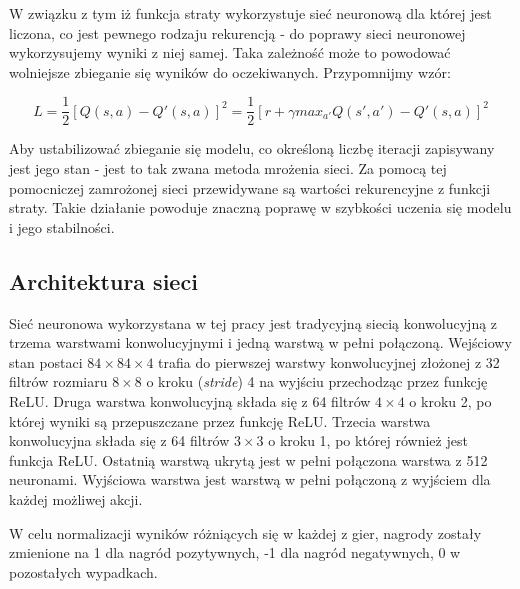 \documentclass[12pt]{article}
\begin{document}
W związku z tym iż funkcja straty wykorzystuje sieć neuronową dla której jest liczona, co jest pewnego rodzaju rekurencją - do poprawy sieci neuronowej wykorzysujemy wyniki z niej samej. Taka zależność może to powodować wolniejsze zbieganie się wyników do oczekiwanych. Przypomnijmy wzór: 

$$L=\frac{1}{2}[Q(s,a)-Q'(s,a)]^2=\frac{1}{2}[r+\gamma max_{a'}Q(s',a')-Q'(s,a)]^2$$

Aby ustabilizować zbieganie się modelu, co określoną liczbę iteracji zapisywany jest jego stan - jest to tak zwana metoda mrożenia sieci. Za pomocą tej pomocniczej zamrożonej sieci przewidywane są wartości rekurencyjne z funkcji straty. Takie działanie powoduje znaczną poprawę w szybkości uczenia się modelu i jego stabilności.

\subsection{Architektura sieci \cite{deepmind_2}}

Sieć neuronowa wykorzystana w tej pracy jest tradycyjną siecią konwolucyjną z trzema warstwami konwolucyjnymi i jedną warstwą w pełni połączoną. Wejściowy stan postaci $84\times84\times4$ trafia do pierwszej warstwy konwolucyjnej złożonej z 32 filtrów rozmiaru $8\times8$ o kroku (\textit{stride}) 4 na wyjściu przechodząc przez funkcję ReLU. Druga warstwa konwolucyjną składa się z 64 filtrów $4\times4$ o kroku 2, po której wyniki są przepuszczane przez funkcję ReLU. Trzecia warstwa konwolucyjna składa się z 64 filtrów $3\times3$ o kroku 1, po której również jest funkcja ReLU. Ostatnią warstwą ukrytą jest w pełni połączona warstwa z 512 neuronami. Wyjściowa warstwa jest warstwą w pełni połączoną z wyjściem dla każdej możliwej akcji.

W celu normalizacji wyników różniących się w każdej z gier, nagrody zostały zmienione na 1 dla nagród pozytywnych, -1 dla nagród negatywnych, 0 w pozostałych wypadkach.
\end{document}
